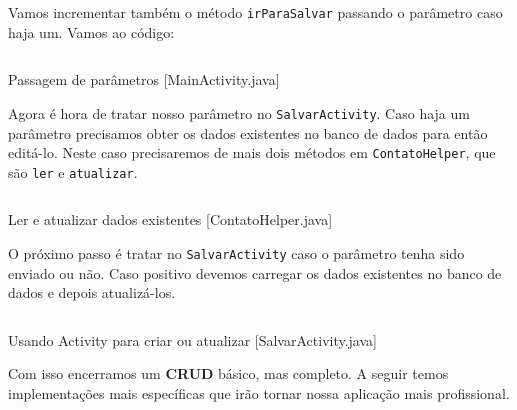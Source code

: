 Vamos incrementar também o método \texttt{irParaSalvar} passando o
parâmetro caso haja um. Vamos ao código:

\begin{listing}[H]
  \inputminted[linenos=true,frame=bottomline,tabsize=3]{ java }{ source/MainActivity-7.java }
  \caption{Passagem de parâmetros [MainActivity.java]}
\end{listing}

Agora é hora de tratar nosso parâmetro no \texttt{SalvarActivity}. Caso
haja um parâmetro precisamos obter os dados existentes no banco de dados
para então editá-lo. Neste caso precisaremos de mais dois métodos em
\texttt{ContatoHelper}, que são \texttt{ler} e \texttt{atualizar}.

\begin{listing}[H]
  \inputminted[linenos=true,frame=bottomline,tabsize=3]{ java }{ source/ContatoHelper-4.java }
  \caption{Ler e atualizar dados existentes [ContatoHelper.java]}
\end{listing}

O próximo passo é tratar no \texttt{SalvarActivity} caso o parâmetro
tenha sido enviado ou não. Caso positivo devemos carregar os dados
existentes no banco de dados e depois atualizá-los.

\begin{listing}[H]
  \inputminted[linenos=true,frame=bottomline,tabsize=3]{ java }{ source/SalvarActivity-3.java }
  \caption{Usando Activity para criar ou atualizar [SalvarActivity.java]}
\end{listing}

Com isso encerramos um \textbf{CRUD} básico, mas completo. A seguir
temos implementações mais específicas que irão tornar nossa aplicação
mais profissional.

